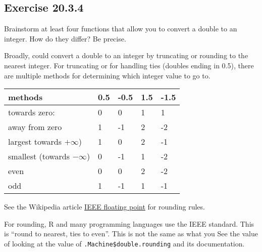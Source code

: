 \documentclass[]{book}
\newenvironment{Shaded}{\begin{snugshade}}{\end{snugshade}}
\newcommand{\CommentTok}[1]{\textcolor[rgb]{0.56,0.35,0.01}{\textit{#1}}}
\newcommand{\ControlFlowTok}[1]{\textcolor[rgb]{0.13,0.29,0.53}{\textbf{#1}}}
\newcommand{\DataTypeTok}[1]{\textcolor[rgb]{0.13,0.29,0.53}{#1}}
\newcommand{\DecValTok}[1]{\textcolor[rgb]{0.00,0.00,0.81}{#1}}
\newcommand{\FloatTok}[1]{\textcolor[rgb]{0.00,0.00,0.81}{#1}}
\newcommand{\KeywordTok}[1]{\textcolor[rgb]{0.13,0.29,0.53}{\textbf{#1}}}
\newcommand{\NormalTok}[1]{#1}
\newcommand{\OperatorTok}[1]{\textcolor[rgb]{0.81,0.36,0.00}{\textbf{#1}}}
\newcommand{\OtherTok}[1]{\textcolor[rgb]{0.56,0.35,0.01}{#1}}
\newcommand{\StringTok}[1]{\textcolor[rgb]{0.31,0.60,0.02}{#1}}
\theoremstyle{plain}
\theoremstyle{remark}
\theoremstyle{definition}
\theoremstyle{definition}
\theoremstyle{definition}
\theoremstyle{remark}
\begin{document}
\hypertarget{exercise-20.3.4}{%
\subsection*{\texorpdfstring{Exercise
{20.3.4}}{Exercise 20.3.4}}\label{exercise-20.3.4}}

Brainstorm at least four functions that allow you to convert a double to
an integer. How do they differ? Be precise.

Broadly, could convert a double to an integer by truncating or rounding
to the nearest integer. For truncating or for handling ties (doubles
ending in 0.5), there are multiple methods for determining which integer
value to go to.

\begin{longtable}[]{@{}lllll@{}}
\toprule
methods & 0.5 & -0.5 & 1.5 & -1.5\tabularnewline
\midrule
\endhead
towards zero: & 0 & 0 & 1 & 1\tabularnewline
away from zero & 1 & -1 & 2 & -2\tabularnewline
largest towards \(+\infty\)) & 1 & 0 & 2 & -1\tabularnewline
smallest (towards \(-\infty\)) & 0 & -1 & 1 & -2\tabularnewline
even & 0 & 0 & 2 & -2\tabularnewline
odd & 1 & -1 & 1 & -1\tabularnewline
\bottomrule
\end{longtable}

See the Wikipedia article
\href{https://en.wikipedia.org/wiki/IEEE_floating_point}{IEEE floating
point} for rounding rules.

For rounding, R and many programming languages use the IEEE standard.
This is ``round to nearest, ties to even''. This is not the same as what
you See the value of looking at the value of
\texttt{.Machine\$double.rounding} and its documentation.

\begin{Shaded}
\end{Shaded}
\end{document}
